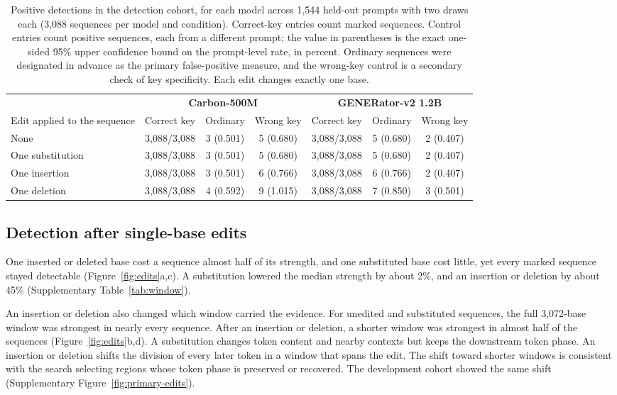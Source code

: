 \documentclass[10pt,twocolumn]{article}
\begin{document}
\begin{table}[tp]
\centering
\caption{Positive detections in the detection cohort, for each model across 1{,}544 held-out prompts
with two draws each (3{,}088 sequences per model and condition). Correct-key entries count marked
sequences. Control entries count positive sequences, each from a different prompt; the value in
parentheses is the exact one-sided 95\% upper confidence bound on the prompt-level rate, in
percent. Ordinary sequences were designated in advance as the primary false-positive measure, and the
wrong-key control is a secondary check of key specificity. Each edit changes exactly one base.}
\label{tab:second}
\small
\setlength{\tabcolsep}{4pt}
\renewcommand{\arraystretch}{1.08}
\begin{tabular}{@{}lccc@{\hspace{12pt}}ccc@{}}
\toprule
& \multicolumn{3}{c}{\textbf{Carbon-500M}} & \multicolumn{3}{c}{\textbf{GENERator-v2 1.2B}} \\
\cmidrule(lr){2-4}\cmidrule(l){5-7}
Edit applied to the sequence & Correct key & Ordinary & Wrong key & Correct key & Ordinary & Wrong key \\
\midrule
None             & 3{,}088/3{,}088 & 3 (0.501) & 5 (0.680) & 3{,}088/3{,}088 & 5 (0.680) & 2 (0.407) \\
One substitution & 3{,}088/3{,}088 & 3 (0.501) & 5 (0.680) & 3{,}088/3{,}088 & 5 (0.680) & 2 (0.407) \\
One insertion    & 3{,}088/3{,}088 & 3 (0.501) & 6 (0.766) & 3{,}088/3{,}088 & 6 (0.766) & 2 (0.407) \\
One deletion     & 3{,}088/3{,}088 & 4 (0.592) & 9 (1.015) & 3{,}088/3{,}088 & 7 (0.850) & 3 (0.501) \\
\bottomrule
\end{tabular}
\end{table}

\subsection{Detection after single-base edits}
\label{sec:single-edits}

One inserted or deleted base cost a sequence almost half of its strength, and one substituted base cost
little, yet every marked sequence stayed detectable (Figure~\ref{fig:edits}a,c). A substitution lowered
the median strength by about 2\%, and an insertion or deletion by about 45\% (Supplementary
Table~\ref{tab:window}).

An insertion or deletion also changed which window carried the evidence. For unedited and
substituted sequences, the full 3{,}072-base window was strongest in nearly every sequence. After an
insertion or deletion, a shorter window was strongest in almost half of the sequences
(Figure~\ref{fig:edits}b,d). A substitution changes token content and nearby contexts but keeps the
downstream token phase. An insertion or deletion shifts the division of every later token in a
window that spans the edit. The shift toward shorter windows is consistent with the search
selecting regions whose token phase is preserved or recovered. The development cohort showed the
same shift (Supplementary Figure~\ref{fig:primary-edits}).
\end{document}
